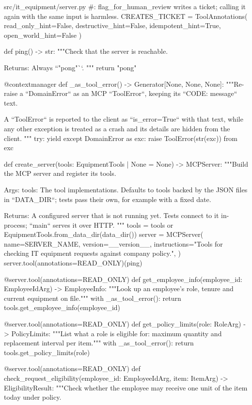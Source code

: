 \documentclass[11pt,letterpaper]{article}
\renewcommand{\_}{\textunderscore\allowbreak}
\begin{document}
\begin{codebox}{src/it_equipment/server.py}
#: flag_for_human_review writes a ticket; calling it again with the same input is harmless.
CREATES_TICKET = ToolAnnotations(
    read_only_hint=False, destructive_hint=False, idempotent_hint=True, open_world_hint=False
)


def ping() -> str:
    """Check that the server is reachable.

    Returns:
        Always ``"pong"``.
    """
    return "pong"


@contextmanager
def _as_tool_error() -> Generator[None, None, None]:
    """Re-raise a ``DomainError`` as an MCP ``ToolError``, keeping its ``CODE: message`` text.

    A ``ToolError`` is reported to the client as ``is_error=True`` with that text, while any
    other exception is treated as a crash and its details are hidden from the client.
    """
    try:
        yield
    except DomainError as exc:
        raise ToolError(str(exc)) from exc


def create_server(tools: EquipmentTools | None = None) -> MCPServer:
    """Build the MCP server and register its tools.

    Args:
        tools: The tool implementations. Defaults to tools backed by the JSON files in
            ``DATA_DIR``; tests pass their own, for example with a fixed date.

    Returns:
        A configured server that is not running yet. Tests connect to it in-process;
        ``main`` serves it over HTTP.
    """
    tools = tools or EquipmentTools.from_data_dir(data_dir())
    server = MCPServer(
        name=SERVER_NAME,
        version=__version__,
        instructions="Tools for checking IT equipment requests against company policy.",
    )
    server.tool(annotations=READ_ONLY)(ping)

    @server.tool(annotations=READ_ONLY)
    def get_employee_info(employee_id: EmployeeIdArg) -> EmployeeInfo:
        """Look up an employee's role, tenure and current equipment on file."""
        with _as_tool_error():
            return tools.get_employee_info(employee_id)

    @server.tool(annotations=READ_ONLY)
    def get_policy_limits(role: RoleArg) -> PolicyLimits:
        """List what a role is eligible for: maximum quantity and replacement interval per item."""
        with _as_tool_error():
            return tools.get_policy_limits(role)

    @server.tool(annotations=READ_ONLY)
    def check_request_eligibility(employee_id: EmployeeIdArg, item: ItemArg) -> EligibilityResult:
        """Check whether the employee may receive one unit of the item today under policy.


\end{codebox}
\end{document}
